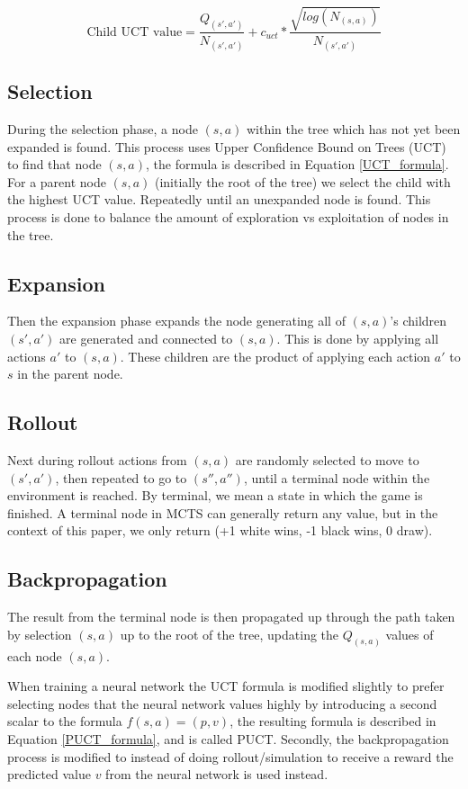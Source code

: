 \begin{equation} \label{UCT_formula}
  \text{Child UCT value} = \frac{Q_{(s',a')}}{N_{(s',a')}} + c_{uct} * \frac{\sqrt{log(N_{(s,a)})}}{N_{(s',a')}}
\end{equation}

\subsection*{Selection}
During the selection phase, a node $(s,a)$ within the tree which has not yet been expanded is found.
This process uses Upper Confidence Bound on Trees (UCT) to find that node $(s,a)$, the formula is described in Equation \ref{UCT_formula}. For a parent node $(s,a)$
(initially the root of the tree) we select the child with the highest UCT value. Repeatedly until an unexpanded
node is found. This process is done to balance the amount of exploration vs exploitation of nodes in the
tree.

\subsection*{Expansion}
Then the expansion phase expands the node generating all of $(s,a)$'s children $(s',a')$ are generated
and connected to $(s,a)$. This is done by applying all actions $a'$ to $(s,a)$. These children are the
product of applying each action $a'$ to $s$ in the parent node.

\subsection*{Rollout}
Next during rollout actions from $(s,a)$ are randomly selected to move to $(s',a')$, then repeated
to go to $(s'',a'')$, until a terminal node within the environment is reached. By terminal, we mean a
state in which the game is finished. A terminal node in MCTS can generally return any value, but in the
context of this paper, we only return (+1 white wins, -1 black wins, 0 draw).


\subsection*{Backpropagation}
The result from the terminal node is then propagated up through the path taken by selection $(s,a)$ up
to the root of the tree, updating the $Q_{(s,a)}$ values of each node $(s,a)$.

When training a neural network the UCT formula is modified slightly to prefer selecting nodes
that the neural network values highly by introducing a second scalar to the formula $f(s,a) = (p,v)$,
the resulting formula is described in Equation \ref{PUCT_formula}, and is called PUCT. Secondly, the backpropagation process
is modified to instead of doing rollout/simulation to receive a reward the predicted value $v$ from
the neural network is used instead.

